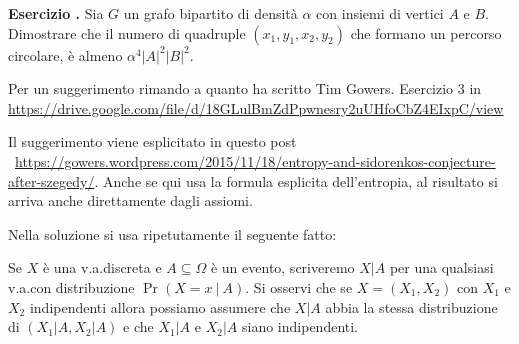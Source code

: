 \documentclass[10pt]{article}
\newcounter{ex}
\newenvironment{exercise}{\addtocounter{ex}{1}\textbf{Esercizio \theex.\quad}}{}
\begin{document}
\begin{exercise}
  Sia $G$ un grafo bipartito di densità $\alpha$ con insiemi di vertici $A$ e $B$. Dimostrare che il numero di quadruple $(x_1,y_1,x_2,y_2)$ che formano un percorso circolare, è almeno $\alpha^4|A|^2|B|^2$.

  Per un suggerimento rimando a quanto ha scritto Tim Gowers. Esercizio 3 in \url{https://drive.google.com/file/d/18GLulBmZdPpwnesry2uUHfoCbZ4EIxpC/view}

  Il suggerimento viene esplicitato in questo post \ \url{https://gowers.wordpress.com/2015/11/18/entropy-and-sidorenkos-conjecture-after-szegedy/}. Anche se qui usa la formula esplicita dell'entropia, al risultato si arriva anche direttamente dagli assiomi.
\end{exercise}


Nella soluzione si usa ripetutamente il seguente fatto:

Se $X$ è una v.a.\@ discreta e $A\subseteq\Omega$ è un evento, scriveremo $X|A$ per una qualsiasi v.a.\@ con distribuzione $\Pr(X=x\ |\ A)$.
Si osservi che se $X=(X_1, X_2)$ con $X_1$ e $X_2$ indipendenti allora possiamo assumere che $X|A$ abbia la stessa distribuzione di $(X_1|A, X_2|A)$ e che $X_1|A$ e $X_2|A$ siano indipendenti.
\end{document}
